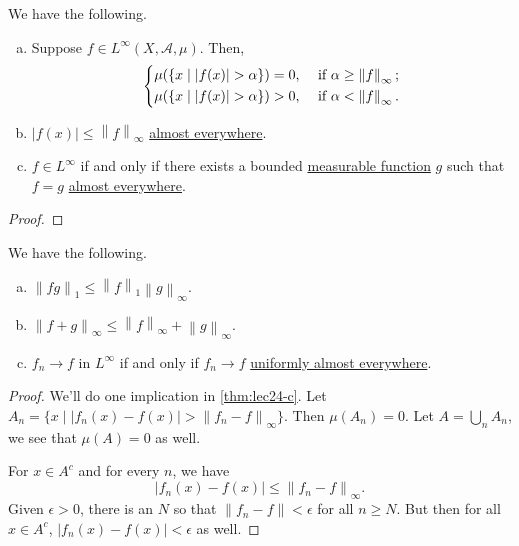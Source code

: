 \begin{lemma}
	We have the following.
	\begin{enumerate}[(a)]
		\item Suppose \(f\in L^{\infty} (X, \mathcal{A} , \mu )\). Then,
		      \[
			      \begin{dcases}
				      \mu (\{x\mid \left\vert f(x) \right\vert > \alpha \}) = 0, & \text{ if } \alpha \geq \left\lVert f\right\rVert _\infty; \\
				      \mu (\{x\mid \left\vert f(x) \right\vert > \alpha \}) > 0, & \text{ if } \alpha < \left\lVert f\right\rVert _\infty.    \\
			      \end{dcases}
		      \]
		\item \(\left\vert f(x) \right\vert \leq \left\lVert f\right\rVert _\infty \) \hyperref[def:mu-almost-everywhere]{almost everywhere}.
		\item \(f\in L^{\infty} \) if and only if there exists a bounded \hyperref[def:measurable-function]{measurable function} \(g\) such that \(f = g\) \hyperref[def:mu-almost-everywhere]{almost everywhere}.
	\end{enumerate}
\end{lemma}
\begin{proof}
\end{proof}

\begin{theorem}\label{thm:lec24}
	We have the following.
	\begin{enumerate}[(a)]
		\item\label{thm:lec24-a} \(\left\lVert fg\right\rVert _1 \leq \left\lVert f\right\rVert _1 \left\lVert g\right\rVert _\infty \).
		\item\label{thm:lec24-b} \(\left\lVert f + g\right\rVert _\infty \leq \left\lVert f\right\rVert _\infty + \left\lVert g\right\rVert _\infty \).
		\item\label{thm:lec24-c} \(f_{n} \to f\) in \(L^{\infty} \) if and only if \(f_{n} \to f\) \hyperref[def:uniformly-almost-everywhere]{uniformly almost everywhere}.
	\end{enumerate}
\end{theorem}
\begin{proof}
	We'll do one implication in \autoref{thm:lec24-c}. Let \(A_{n} = \{x\mid \left\vert f_{n} (x) - f(x) \right\vert > \left\lVert f_{n} - f \right\rVert _\infty  \}\). Then \(\mu (A_{n} ) = 0\). Let \(A = \bigcup_{n} A_{n} \), we see that \(\mu (A)= 0\) as well.

	For \(x\in A^{c} \) and for every \(n\), we have
	\[
		\left\vert f_{n} (x) - f(x) \right\vert \leq \left\lVert f_{n} - f\right\rVert _\infty .
	\]
	Given \(\epsilon >0\), there is an \(N\) so that \(\left\lVert f_{n} - f\right\rVert < \epsilon\) for all \(n\geq N\). But then for all \(x\in A^{c} \), \(\left\vert f_{n} (x) - f(x) \right\vert <\epsilon \) as well.
\end{proof}

